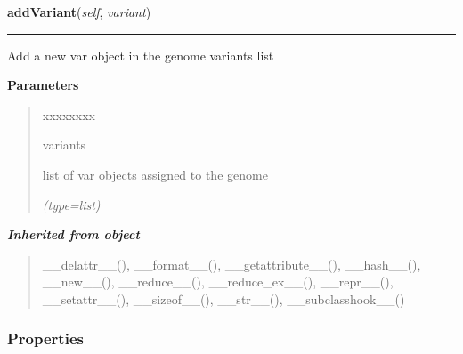     \label{script-FixedVar:genome:addVariant}

    \vspace{0.5ex}

\hspace{.8\funcindent}\begin{boxedminipage}{\funcwidth}

    \raggedright \textbf{addVariant}(\textit{self}, \textit{variant})

    \vspace{-1.5ex}

    \rule{\textwidth}{0.5\fboxrule}
\setlength{\parskip}{2ex}
    Add a new var object in the genome variants list

\setlength{\parskip}{1ex}
      \textbf{Parameters}
      \vspace{-1ex}

      \begin{quote}
        \begin{Ventry}{xxxxxxxx}

          \item[variants]

          list of var objects assigned to the genome

            {\it (type=list)}

        \end{Ventry}

      \end{quote}

    \end{boxedminipage}


\large{\textbf{\textit{Inherited from object}}}

\begin{quote}
\_\_delattr\_\_(), \_\_format\_\_(), \_\_getattribute\_\_(), \_\_hash\_\_(), \_\_new\_\_(), \_\_reduce\_\_(), \_\_reduce\_ex\_\_(), \_\_repr\_\_(), \_\_setattr\_\_(), \_\_sizeof\_\_(), \_\_str\_\_(), \_\_subclasshook\_\_()
\end{quote}


  \subsubsection{Properties}

